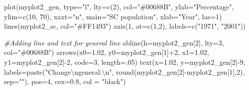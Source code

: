 \documentclass[
]{article}
\newenvironment{Shaded}{\begin{snugshade}}{\end{snugshade}}
\newcommand{\AttributeTok}[1]{\textcolor[rgb]{0.77,0.63,0.00}{#1}}
\newcommand{\CommentTok}[1]{\textcolor[rgb]{0.56,0.35,0.01}{\textit{#1}}}
\newcommand{\DecValTok}[1]{\textcolor[rgb]{0.00,0.00,0.81}{#1}}
\newcommand{\FloatTok}[1]{\textcolor[rgb]{0.00,0.00,0.81}{#1}}
\newcommand{\FunctionTok}[1]{\textcolor[rgb]{0.00,0.00,0.00}{#1}}
\newcommand{\NormalTok}[1]{#1}
\newcommand{\SpecialCharTok}[1]{\textcolor[rgb]{0.00,0.00,0.00}{#1}}
\newcommand{\StringTok}[1]{\textcolor[rgb]{0.31,0.60,0.02}{#1}}
\begin{document}
\begin{Shaded}
\begin{Highlighting}[]
\FunctionTok{plot}\NormalTok{(myplot2\_gen, }\AttributeTok{type=}\StringTok{"l"}\NormalTok{, }\AttributeTok{lty=}\FunctionTok{c}\NormalTok{(}\DecValTok{2}\NormalTok{), }\AttributeTok{col=}\StringTok{"\#00688B"}\NormalTok{, }\AttributeTok{ylab=}\StringTok{"Percentage"}\NormalTok{, }\AttributeTok{ylim=}\FunctionTok{c}\NormalTok{(}\DecValTok{10}\NormalTok{, }\DecValTok{70}\NormalTok{), }\AttributeTok{xaxt=}\StringTok{"n"}\NormalTok{, }\AttributeTok{main=}\StringTok{"SC population"}\NormalTok{, }\AttributeTok{xlab=}\StringTok{"Year"}\NormalTok{, }\AttributeTok{las=}\DecValTok{1}\NormalTok{)}
\FunctionTok{lines}\NormalTok{(myplot2\_sc, }\AttributeTok{col=}\StringTok{"\#FF1493"}\NormalTok{)}
\FunctionTok{axis}\NormalTok{(}\DecValTok{1}\NormalTok{, }\AttributeTok{at=}\FunctionTok{c}\NormalTok{(}\DecValTok{1}\NormalTok{,}\DecValTok{2}\NormalTok{), }\AttributeTok{labels=}\FunctionTok{c}\NormalTok{(}\StringTok{"1971"}\NormalTok{, }\StringTok{"2001"}\NormalTok{))}

\CommentTok{\#Adding line and text for general line}
\FunctionTok{abline}\NormalTok{(}\AttributeTok{h=}\NormalTok{myplot2\_gen[}\DecValTok{2}\NormalTok{], }\AttributeTok{lty=}\DecValTok{3}\NormalTok{, }\AttributeTok{col=}\StringTok{"\#00688B"}\NormalTok{)}
\FunctionTok{arrows}\NormalTok{(}\AttributeTok{x0=}\FloatTok{1.02}\NormalTok{, }\AttributeTok{y0=}\NormalTok{myplot2\_gen[}\DecValTok{1}\NormalTok{]}\SpecialCharTok{+}\DecValTok{2}\NormalTok{, }\AttributeTok{x1=}\FloatTok{1.02}\NormalTok{, }\AttributeTok{y1=}\NormalTok{myplot2\_gen[}\DecValTok{2}\NormalTok{]}\SpecialCharTok{{-}}\DecValTok{2}\NormalTok{, }\AttributeTok{code=}\DecValTok{3}\NormalTok{, }\AttributeTok{length=}\NormalTok{.}\DecValTok{05}\NormalTok{)}
\FunctionTok{text}\NormalTok{(}\AttributeTok{x=}\FloatTok{1.02}\NormalTok{, }\AttributeTok{y=}\NormalTok{myplot2\_gen[}\DecValTok{2}\NormalTok{]}\SpecialCharTok{{-}}\DecValTok{9}\NormalTok{,  }\AttributeTok{labels=}\FunctionTok{paste}\NormalTok{(}\StringTok{"Change}\SpecialCharTok{\textbackslash{}n}\StringTok{general:}\SpecialCharTok{\textbackslash{}n}\StringTok{"}\NormalTok{, }\FunctionTok{round}\NormalTok{(myplot2\_gen[}\DecValTok{2}\NormalTok{]}\SpecialCharTok{{-}}\NormalTok{myplot2\_gen[}\DecValTok{1}\NormalTok{],}\DecValTok{2}\NormalTok{), }\AttributeTok{sep=}\StringTok{""}\NormalTok{), }\AttributeTok{pos=}\DecValTok{4}\NormalTok{, }\AttributeTok{cex=}\FloatTok{0.8}\NormalTok{, }\AttributeTok{col =} \StringTok{"black"}\NormalTok{)}


\end{Highlighting}
\end{Shaded}
\end{document}
